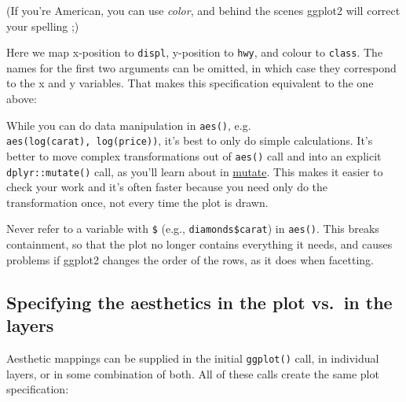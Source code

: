 (If you're American, you can use \emph{color}, and behind the scenes
ggplot2 will correct your spelling ;)

Here we map x-position to \texttt{displ}, y-position to \texttt{hwy},
and colour to \texttt{class}. The names for the first two arguments can
be omitted, in which case they correspond to the x and y variables. That
makes this specification equivalent to the one above:

\begin{Shaded}
\begin{Highlighting}[]
 
\end{Highlighting}
\end{Shaded}

While you can do data manipulation in \texttt{aes()}, e.g.
\texttt{aes(log(carat),\ log(price))}, it's best to only do simple
calculations. It's better to move complex transformations out of
\texttt{aes()} call and into an explicit \texttt{dplyr::mutate()} call,
as you'll learn about in \hyperref[mutate]{mutate}. This makes it easier
to check your work and it's often faster because you need only do the
transformation once, not every time the plot is drawn.

Never refer to a variable with \texttt{\$} (e.g.,
\texttt{diamonds\$carat}) in \texttt{aes()}. This breaks containment, so
that the plot no longer contains everything it needs, and causes
problems if ggplot2 changes the order of the rows, as it does when
facetting. \indexc{\$}

\subsection{Specifying the aesthetics in the plot vs.~in the
layers}\label{sub:plots-and-layers}

Aesthetic mappings can be supplied in the initial \texttt{ggplot()}
call, in individual layers, or in some combination of both. All of these
calls create the same plot specification:

\begin{Shaded}
\begin{Highlighting}[]
 \StringTok{ }
\StringTok{  }\NormalTok{()}
\StringTok{ }
\StringTok{  }\NormalTok{(}\NormalTok{(} 
\StringTok{ }
\StringTok{  }\NormalTok{(}\NormalTok{(}  
\StringTok{ }
\StringTok{  }\NormalTok{(} 
\end{Highlighting}
\end{Shaded}

